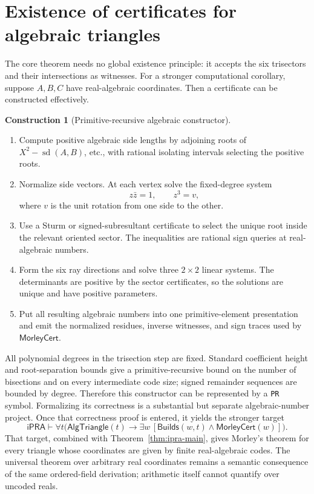 \documentclass[11pt]{article}
\theoremstyle{definition}
\newtheorem{construction}[theorem]{Construction}
\newcommand{\iPRA}{\mathsf{iPRA}}
\newcommand{\Cert}{\mathsf{MorleyCert}}
\newcommand{\sqdist}{\operatorname{sd}}
\newcommand{\code}[1]{\texttt{#1}}
\begin{document}
\section{Existence of certificates for algebraic triangles}
\label{sec:existence}

The core theorem needs no global existence principle: it accepts the six
trisectors and their intersections as witnesses.  For a stronger
computational corollary, suppose $A,B,C$ have real-algebraic coordinates.
Then a certificate can be constructed effectively.

\begin{construction}[Primitive-recursive algebraic constructor]
\begin{enumerate}
\item Compute positive algebraic side lengths by adjoining roots of
$X^2-\sqdist(A,B)$, etc., with rational isolating intervals selecting the
positive roots.
\item Normalize side vectors.  At each vertex solve the fixed-degree system
\[
 z\bar z=1,\qquad z^3=v,
\]
where $v$ is the unit rotation from one side to the other.
\item Use a Sturm or signed-subresultant certificate to select the unique root
inside the relevant oriented sector.  The inequalities are rational sign
queries at real-algebraic numbers.
\item Form the six ray directions and solve three $2\times2$ linear systems.
The determinants are positive by the sector certificates, so the solutions are
unique and have positive parameters.
\item Put all resulting algebraic numbers into one primitive-element
presentation and emit the normalized residues, inverse witnesses, and sign
traces used by $\Cert$.
\end{enumerate}
\end{construction}

All polynomial degrees in the trisection step are fixed.  Standard coefficient
height and root-separation bounds give a primitive-recursive bound on the
number of bisections and on every intermediate code size; signed remainder
sequences are bounded by degree.  Therefore this constructor can be represented
by a \code{PR} symbol.  Formalizing its correctness is a substantial but
separate algebraic-number project.  Once that correctness proof is entered,
it yields the stronger target
\[
 \iPRA\vdash\forall t\bigl(\mathsf{AlgTriangle}(t)
 \to\exists w\,[\mathsf{Builds}(w,t)\wedge\Cert(w)]\bigr).
\]
That target, combined with Theorem~\ref{thm:ipra-main}, gives Morley's theorem
for every triangle whose coordinates are given by finite real-algebraic codes.
The universal theorem over arbitrary real coordinates remains a semantic
consequence of the same ordered-field derivation; arithmetic itself cannot
quantify over uncoded reals.
\end{document}
